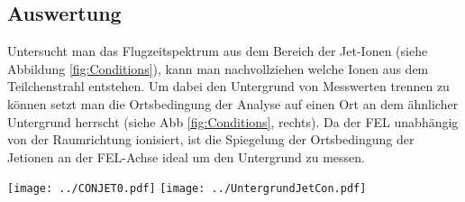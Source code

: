 \subsection{Auswertung}

Untersucht man das Flugzeitspektrum aus dem Bereich der Jet-Ionen (siehe Abbildung \ref{fig:Conditions}), kann man nachvollziehen welche Ionen aus dem Teilchenstrahl entstehen. Um dabei den Untergrund von Messwerten trennen zu können setzt man die Ortsbedingung der Analyse auf einen Ort an dem ähnlicher Untergrund herrscht (siehe Abb \ref{fig:Conditions}, rechts). Da der FEL unabhängig von der Raumrichtung ionisiert, ist die Spiegelung der Ortsbedingung der Jetionen an der FEL-Achse ideal um den Untergrund zu messen.
\begin{center}
\begin{minipage}{\linewidth}
\centering
\texttt{[image: ../CONJET0.pdf]}%
\texttt{[image: ../UntergrundJetCon.pdf]}%
 \label{fig:Conditions}
\end{minipage} 
\end{center} 

